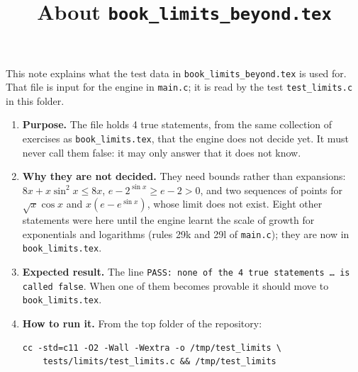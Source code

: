 \documentclass[11pt,a4paper]{article}
\title{About \texttt{book\_limits\_beyond.tex}}
\author{}
\date{}
\begin{document}
\maketitle
This note explains what the test data in \texttt{book\_limits\_beyond.tex} is used for. That file is input for the engine in \texttt{main.c}; it is read by the test \texttt{test\_limits.c} in this folder.

\begin{enumerate}
\item \textbf{Purpose.} The file holds 4 true statements, from the same collection of exercises as \texttt{book\_limits.tex}, that the engine does not decide yet. It must never call them false: it may only answer that it does not know.

\item \textbf{Why they are not decided.} They need bounds rather than expansions: $8x + x\sin^{2} x \le 8x$, $e - 2^{\sin x} \ge e - 2 > 0$, and two sequences of points for $\sqrt{x}\cos x$ and $x(e - e^{\sin x})$, whose limit does not exist. Eight other statements were here until the engine learnt the scale of growth for exponentials and logarithms (rules 29k and 29l of \texttt{main.c}); they are now in \texttt{book\_limits.tex}.

\item \textbf{Expected result.} The line \texttt{PASS: none of the 4 true statements \dots{} is called false}. When one of them becomes provable it should move to \texttt{book\_limits.tex}.

\item \textbf{How to run it.} From the top folder of the repository:
\begin{verbatim}
cc -std=c11 -O2 -Wall -Wextra -o /tmp/test_limits \
    tests/limits/test_limits.c && /tmp/test_limits
\end{verbatim}
\end{enumerate}
\end{document}
